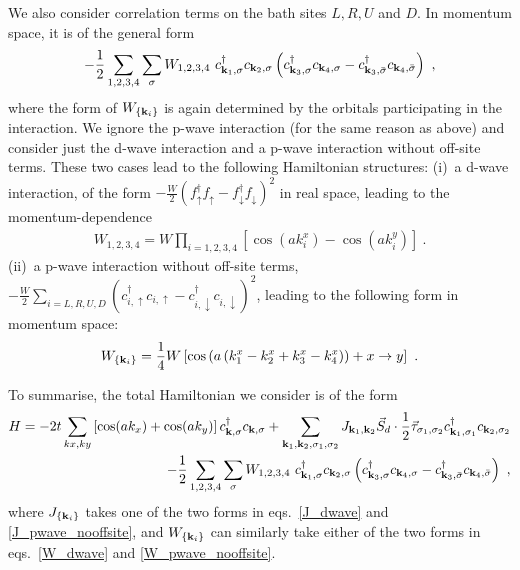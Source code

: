 \documentclass{revtex4-2}
\begin{document}
We also consider correlation terms on the bath sites \(L,R,U\) and \(D\). In momentum space, it is of the general form
\begin{equation}\begin{aligned}
-\frac{1}{2}\sum_{1, 2, 3, 4}\sum_\sigma W_{1,2,3,4}~ c^\dagger_{{\bf k}_1,\sigma}c_{{\bf k}_2,\sigma}\left(c^\dagger_{{\bf k}_3,\sigma}c_{{\bf k}_4,\sigma} - c^\dagger_{{\bf k}_3,\bar\sigma}c_{{\bf k}_4,\bar\sigma}\right) ~,
\end{aligned}\end{equation}
where the form of \(W_{\left\{{\bf k}_i\right\}}\) is again determined by the orbitals participating in the interaction. We ignore the p-wave interaction (for the same reason as above) and consider just the d-wave interaction and a p-wave interaction without off-site terms. These two cases lead to the following Hamiltonian structures:
(i)~a d-wave interaction, of the form \(-\frac{W}{2}\left(f^\dagger_{\uparrow}f_{\uparrow} - f^\dagger_{\downarrow}f_{\downarrow}\right)^2\) in real space, leading to the momentum-dependence
\begin{equation}\begin{aligned}\label{W_dwave}
	W_{1,2,3,4} = W\prod_{i=1,2,3,4}\left[\cos\left( ak_i^x \right) - \cos\left( ak_i^y \right) \right]~.
\end{aligned}\end{equation}
(ii)~a p-wave interaction without off-site terms, \(-\frac{W}{2}\sum_{i=L,R,U,D}\left(c^\dagger_{i,\uparrow}c_{i,\uparrow} - c^\dagger_{i,\downarrow}c_{i,\downarrow}\right)^2\), leading to the following form in momentum space:
\begin{equation}\begin{aligned}\label{W_pwave_nooffsite}
	W_{\left\{{\bf k}_i\right\}} = \frac{1}{4}W\left[\cos\left(a\left(k_1^x - k_2^x + k_3^x - k_4^x\right)\right) + x \to y\right]~.
\end{aligned}\end{equation}

To summarise, the total Hamiltonian we consider is of the form
\begin{equation}\begin{aligned}\label{hamiltonian}
	H = -2t\sum_{kx,k y}\left[\cos(ak_x) + \cos(ak_y)\right] c^\dagger_{{\bf k},\sigma}c_{{\bf k},\sigma} + \sum_{{\bf k}_1, {\bf k}_2, \sigma_1, \sigma_2} J_{{\bf k}_1, {\bf k}_2} \vec{S}_d\cdot\frac{1}{2}\vec{\tau}_{\sigma_1,\sigma_2} c^\dagger_{{\bf k}_1,\sigma_1}c_{{\bf k}_2,\sigma_2} \\
-\frac{1}{2}\sum_{1, 2, 3, 4}\sum_\sigma W_{1,2,3,4}~ c^\dagger_{{\bf k}_1,\sigma}c_{{\bf k}_2,\sigma}\left(c^\dagger_{{\bf k}_3,\sigma}c_{{\bf k}_4,\sigma} - c^\dagger_{{\bf k}_3,\bar\sigma}c_{{\bf k}_4,\bar\sigma}\right)~,
\end{aligned}\end{equation}
where \(J_{\left\{ {\bf k}_i \right\} }\) takes one of the two forms in eqs.~\ref{J_dwave} and \ref{J_pwave_nooffsite}, and \(W_{\left\{{\bf k}_i\right\}}\) can similarly take either of the two forms in eqs.~\ref{W_dwave} and \ref{W_pwave_nooffsite}. 
\end{document}
